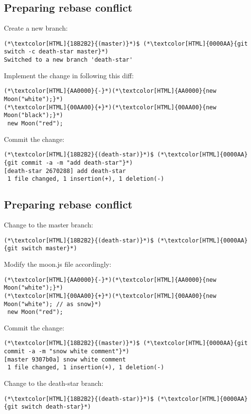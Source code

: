 \subsection{Preparing rebase conflict}
\begin{frame}[fragile]
  \subslidetitle

  Create a new  branch:
  \begin{lstlisting}
(*\textcolor[HTML]{18B2B2}{(master)}*)$ (*\textcolor[HTML]{0000AA}{git switch -c death-star master}*)
Switched to a new branch 'death-star'
\end{lstlisting}

  Implement the change in  following this diff:

  \begin{lstlisting}
(*\textcolor[HTML]{AA0000}{-}*)(*\textcolor[HTML]{AA0000}{new Moon("white");}*)
(*\textcolor[HTML]{00AA00}{+}*)(*\textcolor[HTML]{00AA00}{new Moon("black");}*)
 new Moon("red");
\end{lstlisting}

  Commit the change:
  \begin{lstlisting}
(*\textcolor[HTML]{18B2B2}{(death-star)}*)$ (*\textcolor[HTML]{0000AA}{git commit -a -m "add death-star"}*)
[death-star 2670288] add death-star
 1 file changed, 1 insertion(+), 1 deletion(-)
\end{lstlisting}
\end{frame}

\subsection{Preparing rebase conflict}
\begin{frame}[fragile]
  \subslidetitle
  Change to the master branch:
   \begin{lstlisting}
(*\textcolor[HTML]{18B2B2}{(death-star)}*)$ (*\textcolor[HTML]{0000AA}{git switch master}*)
\end{lstlisting}

  Modify the moon.js file accordingly:
  \begin{lstlisting}
(*\textcolor[HTML]{AA0000}{-}*)(*\textcolor[HTML]{AA0000}{new Moon("white");}*)
(*\textcolor[HTML]{00AA00}{+}*)(*\textcolor[HTML]{00AA00}{new Moon("white"); // as snow}*)
 new Moon("red");
\end{lstlisting}

  Commit the change:
  \begin{lstlisting}
(*\textcolor[HTML]{18B2B2}{(master)}*)$ (*\textcolor[HTML]{0000AA}{git commit -a -m "snow white comment"}*)
[master 9307b0a] snow white comment
 1 file changed, 1 insertion(+), 1 deletion(-)
\end{lstlisting}
  Change to the death-star branch:
   \begin{lstlisting}
(*\textcolor[HTML]{18B2B2}{(death-star)}*)$ (*\textcolor[HTML]{0000AA}{git switch death-star}*)
\end{lstlisting}
\end{frame}

